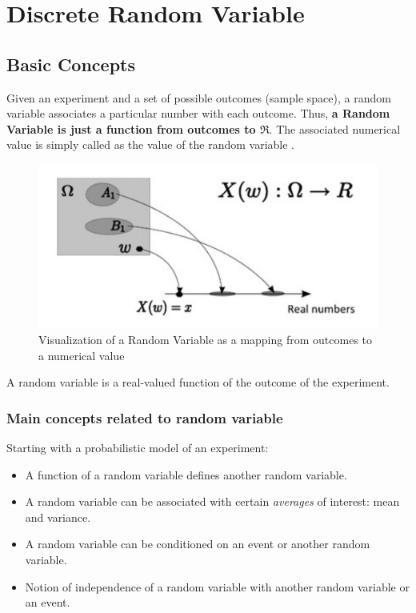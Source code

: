 \newcommand{\RV}{Random Variable } 
\newcommand{\rv}{random variable } 
\chapter{Discrete \RV}

\section{Basic Concepts}
Given an experiment and a set of possible outcomes (sample space), a \rv associates a particular number with each outcome. Thus, \textbf{ a \RV is just a function from outcomes to $\Re$}. The associated numerical value is simply called as the value of the \rv.

\begin{figure}[h]
   \center
   \includegraphics[width=.6\textwidth]{images/P_random_variable.jpg}
   \captionsetup{width=0.7\textwidth}
   \caption{Visualization of a \RV as a mapping from outcomes to a numerical value}
\end{figure}

\begin{definition}
    A \rv is a real-valued function of the outcome of the experiment.
\end{definition}

\subsection{Main concepts related to \rv}
Starting with a probabilistic model of an experiment:
\begin{itemize}
    \item A function of a \rv defines another random variable.
    \item A \rv can be associated with certain \textit{averages} of interest: mean and variance.
    \item A \rv can be conditioned on an event or another random variable.
    \item Notion of independence of a \rv with another \rv or an event.
\end{itemize}

